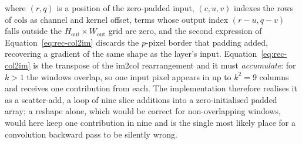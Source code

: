 where $(r,q)$ is a position of the zero-padded input, $(c,u,v)$ indexes the rows of $\mathrm{cols}$ as channel and kernel offset, terms whose output index $(r-u,q-v)$ falls outside the $H_{\mathrm{out}}\times W_{\mathrm{out}}$ grid are zero, and the second expression of Equation~\ref{eq:rec-col2im} discards the $p$-pixel border that padding added, recovering a gradient of the same shape as the layer's input.
Equation~\ref{eq:rec-col2im} is the transpose of the im2col rearrangement and it must \emph{accumulate}: for $k>1$ the windows overlap, so one input pixel appears in up to $k^2=9$ columns and receives one contribution from each.
The implementation therefore realises it as a scatter-add, a loop of nine slice additions into a zero-initialised padded array; a reshape alone, which would be correct for non-overlapping windows, would here keep one contribution in nine and is the single most likely place for a convolution backward pass to be silently wrong.

